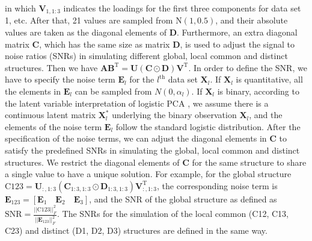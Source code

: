 in which $\mathbf{V}_{1,1:3}$ indicates the loadings for the first three components for data set 1, etc. After that, 21 values are sampled from $\text{N}(1,0.5)$, and their absolute values are taken as the diagonal elements of $\mathbf{D}$. Furthermore, an extra diagonal matrix $\mathbf{C}$, which has the same size as matrix $\mathbf{D}$, is used to adjust the signal to noise ratios (SNRs) in simulating different global, local common and distinct structures. Then we have $\mathbf{A}\mathbf{B}^{\text{T}} = \mathbf{U}(\mathbf{C}\odot \mathbf{D})\mathbf{V}^{\text{T}}$. In order to define the SNR, we have to specify the noise term $\mathbf{E}_l$ for the $l^{\text{th}}$ data set $\mathbf{X}_l$. If $\mathbf{X}_l$ is quantitative, all the elements in $\mathbf{E}_l$ can be sampled from $N(0,\alpha_l)$. If $\mathbf{X}_l$ is binary, according to the latent variable interpretation of logistic PCA \cite{song2019logistic}, we assume there is a continuous latent matrix $\mathbf{X}_{l}^{\ast}$ underlying the binary observation $\mathbf{X}_l$, and the elements of the noise term $\mathbf{E}_l$ follow the standard logistic distribution. After the specification of the noise terms, we can adjust the diagonal elements in $\mathbf{C}$ to satisfy the predefined SNRs in simulating the global, local common and distinct structures. We restrict the diagonal elements of $\mathbf{C}$ for the same structure to share a single value to have a unique solution. For example, for the global structure $\text{C}123 = \mathbf{U}_{:,1:3}(\mathbf{C}_{1:3,1:3} \odot \mathbf{D}_{1:3,1:3}) \mathbf{V}_{:,1:3}^{\text{T}}$, the corresponding noise term is $\mathbf{E}_{123} = [\mathbf{E}_{1} \quad \mathbf{E}_{2} \quad \mathbf{E}_{3}]$, and the SNR of the global structure as defined as $\text{SNR} = \frac{||\text{C}123||_F^2}{||\mathbf{E}_{123}||_F^2}$. The SNRs for the simulation of the local common (C12, C13, C23) and distinct (D1, D2, D3) structures are defined in the same way.

